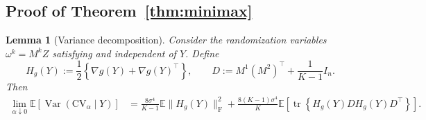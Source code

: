 \documentclass[12pt]{article}
\newtheorem{lemma}{Lemma}[section]
\newcommand{\tran}{^\intercal}
\theoremstyle{general}
\newcommand{\cv}{{\mathrm{CV}}}
\begin{document}
\subsection{Proof of Theorem~\ref{thm:minimax}}
\label{prf:thm:minimax}

\begin{lemma}[Variance decomposition]
\label{lem:reducible:variance}
Consider the randomization variables $\omega^k=M^kZ$ satisfying
 and independent of $Y$. Define
\[
H_g(Y)
:=
\frac12\left\{
\nabla g(Y)+\nabla g(Y)\tran
\right\},\qquad
D
:=
M^1(M^2)\tran+\frac{1}{K-1}I_n.
\]
Then
\begin{align*}
\lim_{\alpha\downarrow0}
\mathbb E\left[
\operatorname{Var}(\cv_\alpha\mid Y)
\right]
&=
\frac{8\sigma^4}{K-1}
\mathbb E\|H_g(Y)\|_{\mathrm F}^2
+
\frac{8(K-1)\sigma^4}{K}
\mathbb E\left[
\operatorname{tr}
\left\{
H_g(Y)D H_g(Y)D\tran
\right\}
\right].
\end{align*}
\end{lemma}
\end{document}
